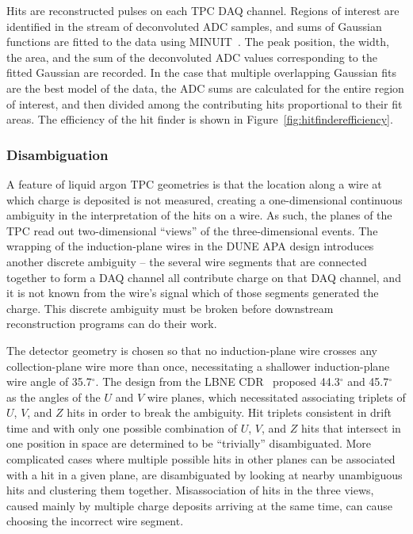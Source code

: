 Hits are reconstructed pulses on each TPC DAQ channel.  Regions of
interest are identified in the stream of deconvoluted ADC samples, and
sums of Gaussian functions are fitted to the data using
MINUIT~\cite{minuit}.  The peak position, the width, the area, and the
sum of the deconvoluted ADC values corresponding to the fitted
Gaussian are recorded.  In the case that multiple overlapping Gaussian
fits are the best model of the data, the ADC sums are calculated for
the entire region of interest, and then divided among the contributing
hits proportional to their fit areas.  The efficiency of the hit
finder is shown in Figure~\ref{fig:hitfinderefficiency}.

\subsubsection{Disambiguation}

A feature of liquid argon TPC geometries is that the location along a
wire at which charge is deposited is not measured, creating a
one-dimensional continuous ambiguity in the interpretation of the hits
on a wire.  As such, the planes of the TPC read out two-dimensional
``views'' of the three-dimensional events.  The wrapping of the
induction-plane wires in the DUNE APA design introduces another
discrete ambiguity -- the several wire segments that are connected
together to form a DAQ channel all contribute charge on that DAQ
channel, and it is not known from the wire's signal which of those
segments generated the charge.  This discrete ambiguity must be broken
before downstream reconstruction programs can do their work.

The detector geometry is chosen so that no induction-plane wire
crosses any collection-plane wire more than once, necessitating a
shallower induction-plane wire angle of 35.7$^\circ$.  The design from
the LBNE CDR~\cite{lbnecdr} proposed 44.3$^\circ$ and 45.7$^\circ$ as
the angles of the $U$ and $V$ wire planes, which necessitated
associating triplets of $U$, $V$, and $Z$ hits in order to break the
ambiguity.  Hit triplets consistent in drift time and with only one
possible combination of $U$, $V$, and $Z$ hits that intersect in one
position in space are determined to be ``trivially'' disambiguated.
More complicated cases where multiple possible hits in other planes
can be associated with a hit in a given plane, are disambiguated by
looking at nearby unambiguous hits and clustering them together.
Misassociation of hits in the three views, caused mainly by multiple
charge deposits arriving at the same time, can cause choosing the
incorrect wire segment.

